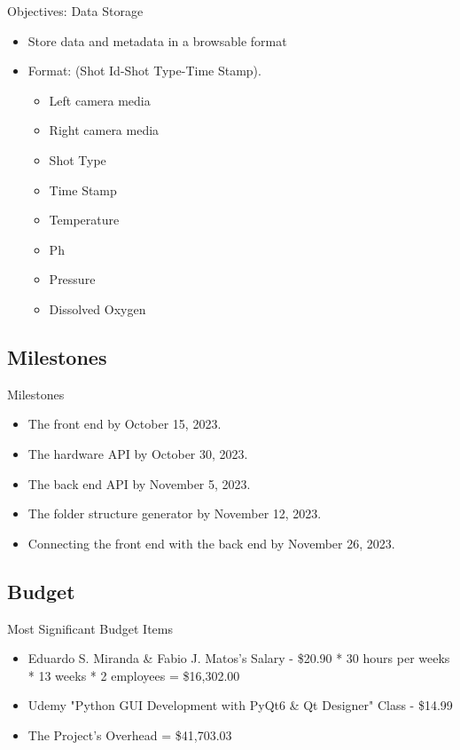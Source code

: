 \documentclass[14pt, aspectratio=169]{beamer}
\begin{document}
\begin{frame}{Objectives: Data Storage}
	\begin{itemize}
		\item Store data and metadata in a browsable format
		\item Format: (Shot Id-Shot Type-Time Stamp).
		      \begin{itemize}
			      \item Left camera media
			      \item Right camera media
			      \item Shot Type
			      \item Time Stamp
			      \item Temperature
			      \item Ph
			      \item Pressure
			      \item Dissolved Oxygen
		      \end{itemize}
	\end{itemize}
\end{frame}
\subsection{Milestones}
\begin{frame}{Milestones}
	\begin{itemize}
		\item The front end by October 15, 2023.
		\item The hardware API by October 30, 2023.
		\item The back end API by November 5, 2023.
		\item The folder structure generator by November 12, 2023.
		\item Connecting the front end with the back end by November 26, 2023.
	\end{itemize}
\end{frame}
\subsection{Budget}
\begin{frame}{Most Significant Budget Items}
	\begin{itemize}
		\item Eduardo S. Miranda \& Fabio J. Matos's Salary - \$20.90 * 30 hours per weeks * 13 weeks  * 2 employees = \$16,302.00
		\item Udemy "Python GUI Development with PyQt6 \& Qt Designer" Class - \$14.99
		\item The Project's Overhead = \$41,703.03
	\end{itemize}
\end{frame}
\end{document}
